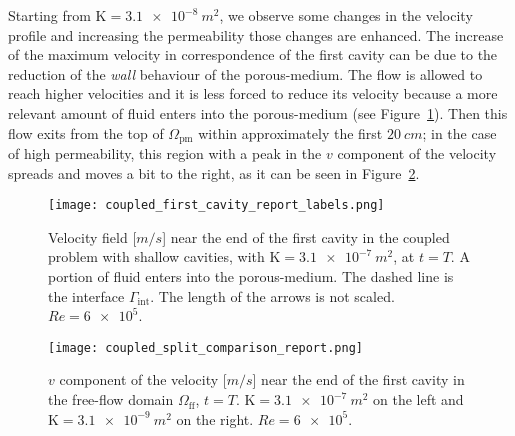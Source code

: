 Starting from $\mathrm{K}=\SI{3.1e-8}{m^2}$, we observe some changes in the velocity 
profile and increasing the permeability those changes are enhanced.
The increase of the maximum velocity in correspondence of the first cavity can 
be due to the reduction of the \emph{wall} behaviour of the porous-medium. The 
flow is allowed to reach higher velocities and it is less forced to reduce 
its velocity because a more relevant amount of fluid enters into the 
porous-medium (see Figure~\ref{fig:coupled_arrows}). Then this flow exits 
from the top of $\Omega_\text{pm}$ within approximately the first 
$\SI{20}{cm}$; in the case of high permeability, this region with a peak in the 
$v$ component of the velocity spreads and 
moves a bit to the right, as it can be seen in Figure~\ref{fig:coupled_vel_split}.
\begin{figure}
	\centering
	\texttt{[image: coupled\_first\_cavity\_report\_labels.png]}
	\caption[Velocity field near the end of the first cavity in the coupled problem with shallow cavities]{Velocity field [$\si{m/s}$] near the end of the first cavity in the coupled problem with shallow cavities, with $\mathrm{K}=\SI{3.1e-7}{m^2}$, at $t=T$. A portion of fluid enters into the porous-medium. The dashed line is the interface $\Gamma_\text{int}$. The length of the arrows is not scaled. $Re=\num{6e5}$.}
	\label{fig:coupled_arrows}
\end{figure}
\begin{figure}
	\centering
	\texttt{[image: coupled\_split\_comparison\_report.png]}
	\caption[$v$ component of the velocity near the end of the first cavity in the coupled problem with shallow cavities]{$v$ component of the velocity [$\si{m/s}$] near the end of the first cavity in the free-flow domain $\Omega_\text{ff}$, $t=T$. $\mathrm{K} = \SI{3.1e-7}{m^2}$ on the left and $\mathrm{K} = \SI{3.1e-9}{m^2}$ on the right. $Re=\num{6e5}$.}
	\label{fig:coupled_vel_split}
\end{figure}

